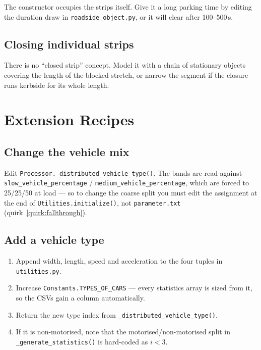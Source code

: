 \documentclass[11pt, a4paper]{article}
\newcommand{\code}[1]{\texttt{#1}}
\begin{document}
The constructor occupies the strips itself. Give it a long parking time by
editing the duration draw in \code{roadside\_object.py}, or it will clear after
100--500\,s.

\subsection{Closing individual strips}

There is no ``closed strip'' concept. Model it with a chain of stationary objects
covering the length of the blocked stretch, or narrow the segment if the closure
runs kerbside for its whole length.

\section{Extension Recipes}

\subsection{Change the vehicle mix}

Edit \code{Processor.\_distributed\_vehicle\_type()}. The bands are read against
\code{slow\_vehicle\_percentage} / \code{medium\_vehicle\_percentage}, which are
forced to 25/25/50 at load --- so to change the coarse split you must edit the
assignment at the end of \code{Utilities.initialize()}, not
\code{parameter.txt} (quirk~\ref{quirk:fallthrough}).

\subsection{Add a vehicle type}

\begin{enumerate}
    \item Append width, length, speed and acceleration to the four tuples in
          \code{utilities.py}.
    \item Increase \code{Constants.TYPES\_OF\_CARS} --- every statistics array is
          sized from it, so the CSVs gain a column automatically.
    \item Return the new type index from \code{\_distributed\_vehicle\_type()}.
    \item If it is non-motorised, note that the motorised/non-motorised split in
          \code{\_generate\_statistics()} is hard-coded as $i < 3$.
\end{enumerate}
\end{document}
